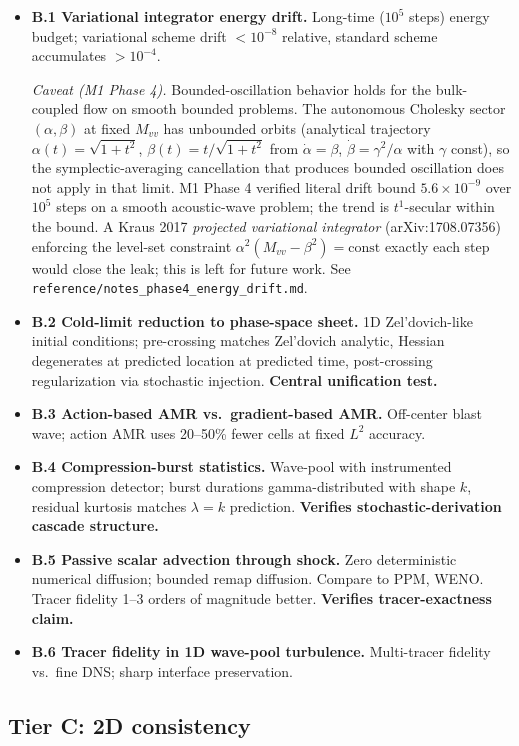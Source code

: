 \documentclass[11pt]{article}
\begin{document}
\begin{itemize}
\item \textbf{B.1 Variational integrator energy drift.} Long-time
($10^5$ steps) energy budget; variational scheme drift $<10^{-8}$
relative, standard scheme accumulates $>10^{-4}$.

\emph{Caveat (M1 Phase 4).} Bounded-oscillation behavior holds for
the bulk-coupled flow on smooth bounded problems. The autonomous
Cholesky sector $(\alpha,\beta)$ at fixed $M_{vv}$ has unbounded
orbits (analytical trajectory $\alpha(t)=\sqrt{1+t^2}$,
$\beta(t)=t/\sqrt{1+t^2}$ from $\dot\alpha=\beta$,
$\dot\beta=\gamma^2/\alpha$ with $\gamma$ const), so the
symplectic-averaging cancellation that produces bounded oscillation
does not apply in that limit. M1 Phase 4 verified literal drift
bound $5.6\times 10^{-9}$ over $10^5$ steps on a smooth acoustic-wave
problem; the trend is $t^1$-secular within the bound. A Kraus 2017
\emph{projected variational integrator} (arXiv:1708.07356) enforcing
the level-set constraint $\alpha^2(M_{vv}-\beta^2)=\mathrm{const}$
exactly each step would close the leak; this is left for future
work. See \verb|reference/notes_phase4_energy_drift.md|.
\item \textbf{B.2 Cold-limit reduction to phase-space sheet.} 1D
Zel'dovich-like initial conditions; pre-crossing matches Zel'dovich
analytic, Hessian degenerates at predicted location at predicted
time, post-crossing regularization via stochastic injection.
\textbf{Central unification test.}
\item \textbf{B.3 Action-based AMR vs.\ gradient-based AMR.} Off-center
blast wave; action AMR uses 20--50\% fewer cells at fixed $L^2$
accuracy.
\item \textbf{B.4 Compression-burst statistics.} Wave-pool with
instrumented compression detector; burst durations gamma-distributed
with shape $k$, residual kurtosis matches $\lambda = k$ prediction.
\textbf{Verifies stochastic-derivation cascade structure.}
\item \textbf{B.5 Passive scalar advection through shock.} Zero
deterministic numerical diffusion; bounded remap diffusion. Compare
to PPM, WENO. Tracer fidelity 1--3 orders of magnitude better.
\textbf{Verifies tracer-exactness claim.}
\item \textbf{B.6 Tracer fidelity in 1D wave-pool turbulence.}
Multi-tracer fidelity vs.\ fine DNS; sharp interface preservation.
\end{itemize}

\subsection{Tier C: 2D consistency}
\label{sec:tier-C}
\end{document}
